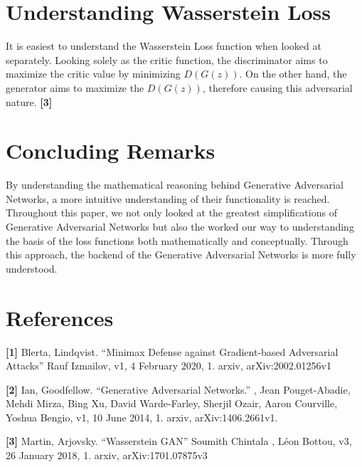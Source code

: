 \documentclass{cup-pan}
\begin{document}
\section{Understanding Wasserstein Loss}
It is easiest to understand the Wasserstein Loss function when looked at separately. Looking solely as the critic function, the discriminator aims to maximize the critic value by minimizing $D(G(z))$. On the other hand, the generator aims to maximize the $D(G(z))$, therefore causing this adversarial nature. \textbf{[3]}

\section{Concluding Remarks}

By understanding the mathematical reasoning behind Generative Adversarial Networks, a more intuitive understanding of their functionality is reached. Throughout this paper, we not only looked at the greatest simplifications of Generative Adversarial Networks but also the worked our way to understanding the basis of the loss functions both mathematically and conceptually. Through this approach, the backend of the Generative Adversarial Networks is more fully understood.

\section{References}

\noindent \textbf{[1]} Blerta, Lindqvist. “Minimax Defense against Gradient-based Adversarial Attacks” Rauf Izmailov, \indent v1, 4 February 2020, 1. arxiv, arXiv:2002.01256v1

\noindent \textbf{[2]} Ian, Goodfellow. “Generative Adversarial Networks.” , Jean Pouget-Abadie, Mehdi Mirza, Bing \indent Xu, David Warde-Farley, Sherjil Ozair, Aaron Courville, Yoshua Bengio, v1, 10 June 2014, 1. arxiv,  \indent arXiv:1406.2661v1. 

\noindent \textbf{[3]} Martin, Arjovsky. “Wasserstein GAN” Soumith Chintala , Léon Bottou, v3, 26 January 2018, 1. \indent arxiv, arXiv:1701.07875v3
\end{document}
